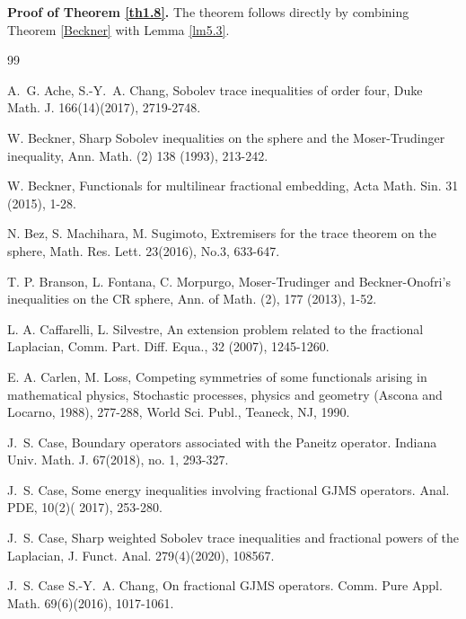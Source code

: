 \documentclass[12pt,reqno]{amsart}%
\theoremstyle{plain}
\numberwithin{equation}{section}
\begin{document}
\textbf{Proof of Theorem \ref{th1.8}.} The theorem follows directly by combining Theorem \ref{Beckner} with Lemma \ref{lm5.3}.












\begin{thebibliography}{99}

A.~G. Ache,  S.-Y.~A. Chang,
 Sobolev trace inequalities of order four,
 Duke Math. J. 166(14)(2017), 2719-2748.


 W. Beckner, Sharp Sobolev inequalities on the sphere and the Moser-Trudinger inequality,  Ann.  Math. (2) 138 (1993), 213-242.

 W. Beckner, Functionals for multilinear fractional embedding, Acta Math. Sin. 31 (2015), 1-28.



N. Bez, S. Machihara, M. Sugimoto, Extremisers for the trace theorem on the sphere, Math. Res. Lett.
 23(2016), No.3, 633-647.






T. P. Branson, L. Fontana,  C. Morpurgo, Moser-Trudinger and Beckner-Onofri's inequalities on the CR sphere, Ann. of  Math. (2), 177 (2013), 1-52.



L. A. Caffarelli,  L. Silvestre, An extension problem related to the fractional Laplacian, Comm. Part. Diff. Equa., 32 (2007), 1245-1260.

 E. A. Carlen, M. Loss,  Competing symmetries of some functionals arising in
mathematical physics,  Stochastic processes, physics and geometry (Ascona and Locarno,
1988), 277-288, World Sci. Publ., Teaneck, NJ, 1990.

	 J.~S. Case,
			Boundary operators associated with the Paneitz operator.
			Indiana Univ. Math. J. 67(2018), no. 1, 293-327.

J.~S. Case,
 Some energy inequalities involving fractional GJMS operators.
 Anal. PDE, 10(2)( 2017), 253-280.

J.~S. Case,
 Sharp weighted Sobolev trace inequalities and fractional powers of
  the Laplacian,
 J. Funct. Anal. 279(4)(2020), 108567.

J.~S. Case S.-Y.~A. Chang,
 On fractional {GJMS} operators.
 Comm. Pure Appl. Math. 69(6)(2016), 1017-1061.


\end{thebibliography}
\end{document}
